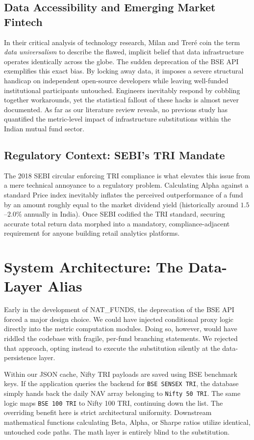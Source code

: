 \documentclass[conference]{IEEEtran}
\begin{document}
\subsection{Data Accessibility and Emerging Market Fintech}
In their critical analysis of technology research, Milan and Treré \cite{milan2020} coin the term \emph{data universalism} to describe the flawed, implicit belief that data infrastructure operates identically across the globe. The sudden deprecation of the BSE API exemplifies this exact bias. By locking away data, it imposes a severe structural handicap on independent open-source developers while leaving well-funded institutional participants untouched. Engineers inevitably respond by cobbling together workarounds, yet the statistical fallout of these hacks is almost never documented. As far as our literature review reveals, no previous study has quantified the metric-level impact of infrastructure substitutions within the Indian mutual fund sector.

\subsection{Regulatory Context: SEBI's TRI Mandate}
The 2018 SEBI circular \cite{sebi2018} enforcing TRI compliance is what elevates this issue from a mere technical annoyance to a regulatory problem. Calculating Alpha against a standard Price index inevitably inflates the perceived outperformance of a fund by an amount roughly equal to the market dividend yield (historically around $1.5$--$2.0\%$ annually in India). Once SEBI codified the TRI standard, securing accurate total return data morphed into a mandatory, compliance-adjacent requirement for anyone building retail analytics platforms.

\section{System Architecture: The Data-Layer Alias}

Early in the development of NAT\_FUNDS, the deprecation of the BSE API forced a major design choice. We could have injected conditional proxy logic directly into the metric computation modules. Doing so, however, would have riddled the codebase with fragile, per-fund branching statements. We rejected that approach, opting instead to execute the substitution silently at the data-persistence layer.

Within our JSON cache, Nifty TRI payloads are saved using BSE benchmark keys. If the application queries the backend for \texttt{BSE SENSEX TRI}, the database simply hands back the daily NAV array belonging to \texttt{Nifty 50 TRI}. The same logic maps \texttt{BSE 100 TRI} to Nifty 100 TRI, continuing down the list. The overriding benefit here is strict architectural uniformity. Downstream mathematical functions calculating Beta, Alpha, or Sharpe ratios utilize identical, untouched code paths. The math layer is entirely blind to the substitution.
\end{document}
